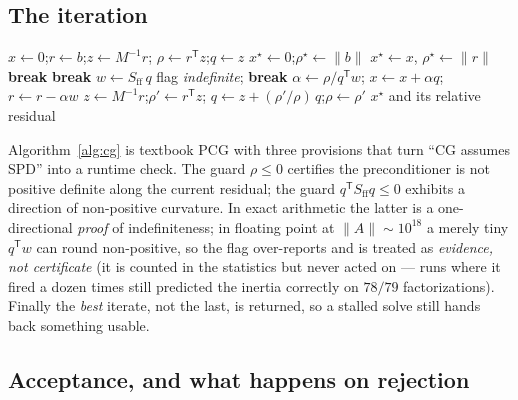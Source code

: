 \documentclass[11pt]{article}
\newcommand{\Sff}{S_{\mathrm{ff}}}
\begin{document}
\subsection{The iteration}

\begin{algorithm}[ht]
\caption{Preconditioned CG with breakdown guards and best-iterate memory}
\label{alg:cg}
\begin{algorithmic}[1]
\State $x \gets 0$;\quad $r \gets b$;\quad $z \gets M^{-1} r$;\quad
       $\rho \gets r^{\mathsf T} z$;\quad $q \gets z$
\State $x^\star \gets 0$;\quad $\rho^\star \gets \|b\|$
   $x^\star \gets x$, $\rho^\star \gets \|r\|$ \EndIf
      \textbf{break} \EndIf
   \textbf{break}
      \EndIf
  \State $w \gets \Sff\, q$ 
   flag \emph{indefinite}; \textbf{break}
      \EndIf
  \State $\alpha \gets \rho / q^{\mathsf T} w$;\quad
         $x \gets x + \alpha q$;\quad $r \gets r - \alpha w$
  \State $z \gets M^{-1} r$;\quad $\rho' \gets r^{\mathsf T} z$;\quad
         $q \gets z + (\rho'/\rho)\, q$;\quad $\rho \gets \rho'$
\EndFor
\State \Return $x^\star$ and its relative residual
\end{algorithmic}
\end{algorithm}

Algorithm~\ref{alg:cg} is textbook PCG \cite{hestenes1952} with three
provisions that turn ``CG assumes SPD'' into a runtime check.  The guard
$\rho \le 0$ certifies the preconditioner is not positive definite along the
current residual; the guard $q^{\mathsf T} \Sff q \le 0$ exhibits a direction
of non-positive curvature.  In exact arithmetic the latter is a
one-directional \emph{proof} of indefiniteness; in floating point at
$\|A\| \sim 10^{18}$ a merely tiny $q^{\mathsf T} w$ can round non-positive,
so the flag over-reports and is treated as \emph{evidence, not certificate}
(it is counted in the statistics but never acted on --- runs where it fired a
dozen times still predicted the inertia correctly on $78/79$
factorizations).  Finally the \emph{best} iterate, not the last, is returned,
so a stalled solve still hands back something usable.

\subsection{Acceptance, and what happens on rejection}
\label{sec:accept}
\end{document}
